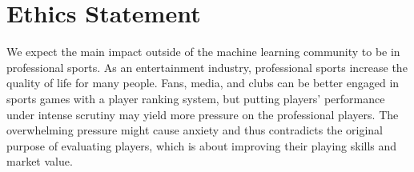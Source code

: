 \documentclass{article}
\begin{document}
\newpage
\section*{Ethics Statement}
We expect the main impact outside of the machine learning community to be in professional sports. As an entertainment industry, professional sports increase the quality of life for many people. Fans, media, and clubs can be better engaged in sports games with a player ranking system, but putting players’ performance under intense scrutiny may yield more pressure on the professional players. The overwhelming pressure might cause anxiety and thus contradicts the original purpose of evaluating players, which is about improving their playing skills and market value.




\end{document}
